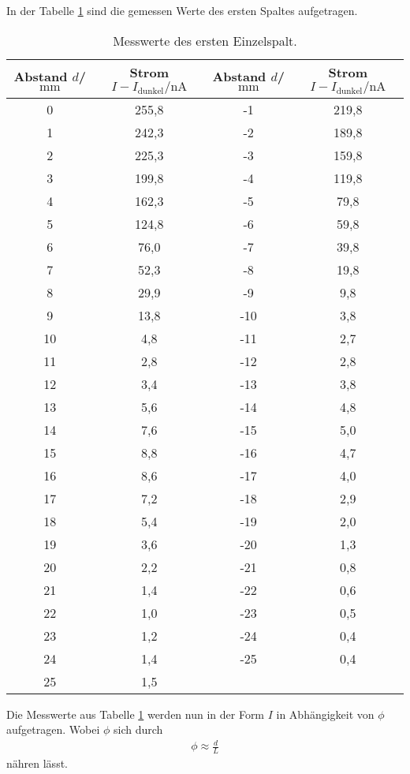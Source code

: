 In der Tabelle \ref{tab:spalt1} sind die gemessen Werte
des ersten Spaltes aufgetragen.
\begin{table}
  \centering
  \caption{Messwerte des ersten Einzelspalt.}
  \label{tab:spalt1}
  \begin{tabular}{c c c c}
Abstand $d$/$\si{\milli\meter}$ & Strom $I-I_\mathrm{dunkel}/\si{\nano\ampere}$ & Abstand $d$/$\si{\milli\meter}$ & Strom $I-I_\mathrm{dunkel}/\si{\nano\ampere}$\\
    \midrule
     0 & 255,8 & -1   & 219,8\\
     1 & 242,3 & -2   & 189,8\\
     2 & 225,3 & -3   & 159,8\\
     3 & 199,8 & -4   & 119,8\\
     4 & 162,3 & -5   & 79,8 \\
     5 & 124,8 & -6   & 59,8 \\
     6 & 76,0  & -7   & 39,8 \\
     7 & 52,3  & -8   & 19,8 \\
     8 & 29,9  & -9   & 9,8  \\
     9 & 13,8  & -10  & 3,8  \\
    10 & 4,8   & -11  & 2,7  \\
    11 & 2,8   & -12  & 2,8  \\
    12 & 3,4   & -13  & 3,8  \\
    13 & 5,6   & -14  & 4,8  \\
    14 & 7,6   & -15  & 5,0  \\
    15 & 8,8   & -16  & 4,7  \\
    16 & 8,6   & -17  & 4,0  \\
    17 & 7,2   & -18  & 2,9  \\
    18 & 5,4   & -19  & 2,0  \\
    19 & 3,6   & -20  & 1,3  \\
    20 & 2,2   & -21  & 0,8  \\
    21 & 1,4   & -22  & 0,6  \\
    22 & 1,0   & -23  & 0,5  \\
    23 & 1,2   & -24  & 0,4  \\
    24 & 1,4   & -25  & 0,4  \\
    25 & 1,5   & &           \\
    \bottomrule
    \end{tabular}
\end{table}
\FloatBarrier
Die Messwerte aus Tabelle \ref{tab:spalt1} werden nun
in der Form $I$ in Abhängigkeit von $\phi$
aufgetragen.
Wobei $\phi$ sich durch
\begin{align*}
  \phi\approx\frac{d}{L}
\end{align*}
nähren lässt.

